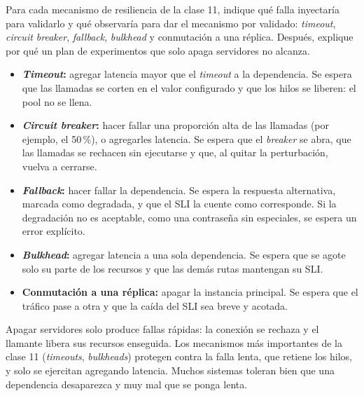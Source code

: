 \documentclass[variant=guia,cover=institutional,mode=screen]{ua-engineering-v6-article}
\begin{document}
\begin{uaexercise}
Para cada mecanismo de resiliencia de la clase 11, indique qué falla inyectaría para validarlo y qué observaría para dar el mecanismo por validado: \emph{timeout}, \emph{circuit breaker}, \emph{fallback}, \emph{bulkhead} y conmutación a una réplica. Después, explique por qué un plan de experimentos que solo apaga servidores no alcanza.
\end{uaexercise}
\begin{uaanswer}
\begin{itemize}
\item \textbf{\emph{Timeout}:} agregar latencia mayor que el \emph{timeout} a la dependencia. Se espera que las llamadas se corten en el valor configurado y que los hilos se liberen: el pool no se llena.
\item \textbf{\emph{Circuit breaker}:} hacer fallar una proporción alta de las llamadas (por ejemplo, el 50\,\%), o agregarles latencia. Se espera que el \emph{breaker} se abra, que las llamadas se rechacen sin ejecutarse y que, al quitar la perturbación, vuelva a cerrarse.
\item \textbf{\emph{Fallback}:} hacer fallar la dependencia. Se espera la respuesta alternativa, marcada como degradada, y que el SLI la cuente como corresponde. Si la degradación no es aceptable, como una contraseña sin especiales, se espera un error explícito.
\item \textbf{\emph{Bulkhead}:} agregar latencia a una sola dependencia. Se espera que se agote solo su parte de los recursos y que las demás rutas mantengan su SLI.
\item \textbf{Conmutación a una réplica:} apagar la instancia principal. Se espera que el tráfico pase a otra y que la caída del SLI sea breve y acotada.
\end{itemize}
Apagar servidores solo produce fallas rápidas: la conexión se rechaza y el llamante libera sus recursos enseguida. Los mecanismos más importantes de la clase 11 (\emph{timeouts}, \emph{bulkheads}) protegen contra la falla lenta, que retiene los hilos, y solo se ejercitan agregando latencia. Muchos sistemas toleran bien que una dependencia desaparezca y muy mal que se ponga lenta.
\end{uaanswer}
\end{document}
